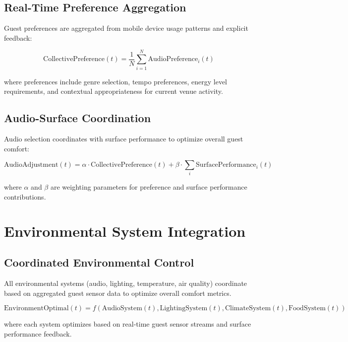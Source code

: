 \documentclass[12pt,a4paper]{article}
\begin{document}
\subsection{Real-Time Preference Aggregation}

Guest preferences are aggregated from mobile device usage patterns and explicit feedback:

\begin{equation}
\text{CollectivePreference}(t) = \frac{1}{N} \sum_{i=1}^{N} \text{AudioPreference}_i(t)
\end{equation}

where preferences include genre selection, tempo preferences, energy level requirements, and contextual appropriateness for current venue activity.

\subsection{Audio-Surface Coordination}

Audio selection coordinates with surface performance to optimize overall guest comfort:

\begin{equation}
\text{AudioAdjustment}(t) = \alpha \cdot \text{CollectivePreference}(t) + \beta \cdot \sum_{i} \text{SurfacePerformance}_i(t)
\end{equation}

where $\alpha$ and $\beta$ are weighting parameters for preference and surface performance contributions.

\section{Environmental System Integration}

\subsection{Coordinated Environmental Control}

All environmental systems (audio, lighting, temperature, air quality) coordinate based on aggregated guest sensor data to optimize overall comfort metrics.

\begin{equation}
\text{EnvironmentOptimal}(t) = f(\text{AudioSystem}(t), \text{LightingSystem}(t), \text{ClimateSystem}(t), \text{FoodSystem}(t))
\end{equation}

where each system optimizes based on real-time guest sensor streams and surface performance feedback.
\end{document}

